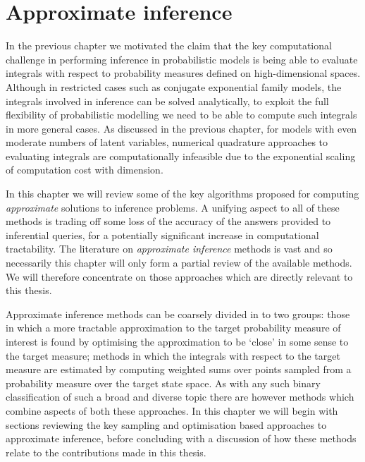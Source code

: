\chapter{Approximate inference}\label{ch:approximate-inference}

In the previous chapter we motivated the claim that the key computational challenge in performing inference in probabilistic models is being able to evaluate integrals with respect to probability measures defined on high-dimensional spaces. Although in restricted cases such as conjugate exponential family models, the integrals involved in inference can be solved analytically, to exploit the full flexibility of probabilistic modelling we need to be able to compute such integrals in more general cases. As discussed in the previous chapter, for models with even moderate numbers of latent variables, numerical quadrature approaches to evaluating integrals are computationally infeasible due to the exponential scaling of computation cost with dimension.

In this chapter we will review some of the key algorithms proposed for computing \emph{approximate} solutions to inference problems. A unifying aspect to all of these methods is trading off some loss of the accuracy of the answers provided to inferential queries, for a potentially significant increase in computational tractability. The literature on \emph{approximate inference} methods is vast and so necessarily this chapter will only form a partial review of the available methods. We will therefore concentrate on those approaches which are directly relevant to this thesis.

Approximate inference methods can be coarsely divided in to two groups: those in which a more tractable approximation to the target probability measure of interest is found by optimising the approximation to be `close' in some sense to the target measure; methods in which the integrals with respect to the target measure are estimated by computing weighted sums over points sampled from a probability measure over the target state space. As with any such binary classification of such a broad and diverse topic there are however methods which combine aspects of both these approaches. In this chapter we will begin with sections reviewing the key sampling and optimisation based approaches to approximate inference, before concluding with a discussion of how these methods relate to the contributions made in this thesis. 

